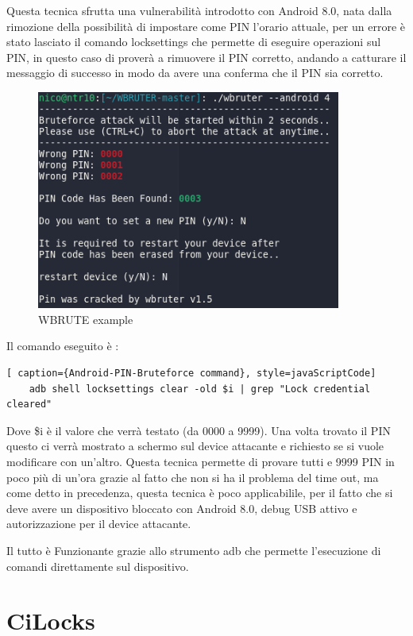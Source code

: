 Questa tecnica sfrutta una vulnerabilità introdotto con Android 8.0, nata dalla rimozione della possibilità di impostare come PIN l’orario attuale, per un errore è stato lasciato il comando locksettings che permette di eseguire operazioni sul PIN, in questo caso di proverà a rimuovere il PIN corretto, andando a catturare il messaggio di successo in modo da avere una conferma che il PIN sia corretto.

\begin{figure}[h!]
	\centering
	\includegraphics[width=100mm]{Immagini/3/wbrute.png}
	\caption{WBRUTE example}
    \label{fig:WBRUTE_example}
\end{figure}

Il comando eseguito è :

\begin{lstlisting}[ caption={Android-PIN-Bruteforce command}, style=javaScriptCode]
	adb shell locksettings clear -old $i | grep "Lock credential cleared"
\end{lstlisting}

Dove \$i è il valore che verrà testato (da 0000 a 9999). Una volta trovato il PIN questo ci verrà mostrato a schermo sul device attacante e richiesto se si vuole modificare con un’altro. Questa tecnica permette di provare tutti e 9999 PIN in poco più di un’ora grazie al fatto che non si ha il problema del time out, ma come detto in precedenza, questa tecnica è poco applicabilile, per il fatto che si deve avere un dispositivo bloccato con Android 8.0, debug USB attivo e autorizzazione per il device attacante.

Il tutto è Funzionante grazie allo strumento adb\cite{adb} che permette l’esecuzione di comandi direttamente sul dispositivo.


\section{CiLocks}

